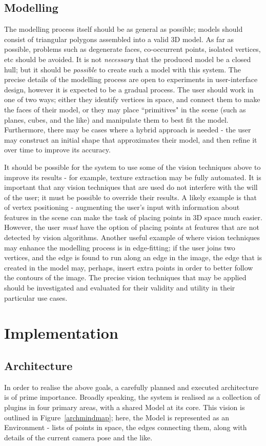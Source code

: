 \documentclass[a4paper,10pt]{article}
\begin{document}
\subsection{Modelling}
\label{approachmodel}
The modelling process itself should be as general as possible; models should consist of triangular polygons assembled into a valid 3D model. As far as possible, problems such as degenerate faces, co-occurrent points, isolated vertices, etc should be avoided. It is not \textit{necessary} that the produced model be a closed hull; but it should be \textit{possible} to create such a model with this system. The precise details of the modelling process are open to experiments in user-interface design, however it is expected to be a gradual process. The user should work in one of two ways; either they identify vertices in space, and connect them to make the faces of their model, or they may place ``primitives" in the scene (such as planes, cubes, and the like) and manipulate them to best fit the model. Furthermore, there may be cases where a hybrid approach is needed - the user may construct an initial shape that approximates their model, and then refine it over time to improve its accuracy.

It should be possible for the system to use some of the vision techniques above to improve its results - for example, texture extraction may be fully automated. It is important that any vision techniques that are used do not interfere with the will of the user; it must be possible to override their results. A likely example is that of vertex positioning - augmenting the user's input with information about features in the scene can make the task of placing points in 3D space much easier. However, the user \textit{must} have the option of placing points at features that are not detected by vision algorithms. Another useful example of where vision techniques may enhance the modelling process is in edge-fitting; if the user joins two vertices, and the edge is found to run along an edge in the image, the edge that is created in the model may, perhaps, insert extra points in order to better follow the contours of the image. The precise vision techniques that may be applied should be investigated and evaluated for their validity and utility in their particular use cases.

\section{Implementation}
\subsection{Architecture}
In order to realise the above goals, a carefully planned and executed architecture is of prime importance. Broadly speaking, the system is realised as a collection of plugins in four primary areas, with a shared Model at its core. This vision is outlined in Figure~\ref{archmindmap}; here, the Model is represented as an Environment - lists of points in space, the edges connecting them, along with details of the current camera pose and the like.
\end{document}
